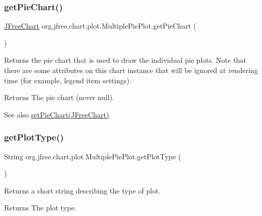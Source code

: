 \subsubsection{\texorpdfstring{get\+Pie\+Chart()}{getPieChart()}}
{\footnotesize\ttfamily \mbox{\hyperlink{classorg_1_1jfree_1_1chart_1_1_j_free_chart}{J\+Free\+Chart}} org.\+jfree.\+chart.\+plot.\+Multiple\+Pie\+Plot.\+get\+Pie\+Chart (\begin{DoxyParamCaption}{ }\end{DoxyParamCaption})}

Returns the pie chart that is used to draw the individual pie plots. Note that there are some attributes on this chart instance that will be ignored at rendering time (for example, legend item settings).

\begin{DoxyReturn}{Returns}
The pie chart (never {\ttfamily null}).
\end{DoxyReturn}
\begin{DoxySeeAlso}{See also}
\mbox{\hyperlink{classorg_1_1jfree_1_1chart_1_1plot_1_1_multiple_pie_plot_a781207ab169b3063bbfab48cfa4c133d}{set\+Pie\+Chart(\+J\+Free\+Chart)}} 
\end{DoxySeeAlso}
\mbox{\label{classorg_1_1jfree_1_1chart_1_1plot_1_1_multiple_pie_plot_a04c02f7409690022b8c7764a564fe809}} 
\subsubsection{\texorpdfstring{get\+Plot\+Type()}{getPlotType()}}
{\footnotesize\ttfamily String org.\+jfree.\+chart.\+plot.\+Multiple\+Pie\+Plot.\+get\+Plot\+Type (\begin{DoxyParamCaption}{ }\end{DoxyParamCaption})}

Returns a short string describing the type of plot.

\begin{DoxyReturn}{Returns}
The plot type. 
\end{DoxyReturn}
\mbox{\label{classorg_1_1jfree_1_1chart_1_1plot_1_1_multiple_pie_plot_a94593f4380298dac542e1e838a69eabb}} 
